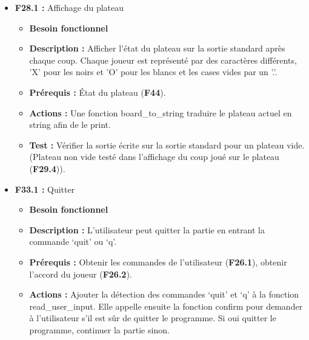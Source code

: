 \documentclass{article}
\begin{document}
\begin{itemize}
\begin{itemize}
\begin{itemize}
            \item \textbf{F29.4 :} Afficher le coup joué sur le plateau
            \begin{itemize}
                \item \textbf{Description :} L’affichage du plateau est mis à jour avec le nouveau coup joué.
                \item \textbf{Prérequis :} Jouer un coup (\textbf{F29.3}), affichage du plateau (\textbf{F28}).
                \item \textbf{Actions :} Rien à faire si F28 est implémentée correctement.
                \item \textbf{Tests :} Lire la sortie standard et vérifier que le coup joué se trouve au bon endroit.
            \end{itemize}
        \end{itemize}
    \end{itemize}
\bigskip
    \item \textbf{F28.1 :} Affichage du plateau
    \begin{itemize}
        \item \textbf{Besoin fonctionnel}
        \item \textbf{Description :} Afficher l’état du plateau sur la sortie standard après chaque coup. Chaque joueur est représenté par des caractères différents, ’X’ pour les noirs et ’O’ pour les blancs et les cases vides par un ’.’.
        \item \textbf{Prérequis :} État du plateau (\textbf{F44}).
        \item \textbf{Actions :} Une fonction board\_to\_string traduire le plateau actuel en string afin de le print.
        \item \textbf{Test :} Vérifier la sortie écrite sur la sortie standard pour un plateau vide. (Plateau non vide testé dans l'affichage du coup joué sur le plateau (\textbf{F29.4})).
    \end{itemize}
\bigskip
    \item \textbf{F33.1 :} Quitter
    \begin{itemize}
        \item \textbf{Besoin fonctionnel}
        \item \textbf{Description :} L’utilisateur peut quitter la partie en entrant la commande ‘quit’ ou ‘q’.
        \item \textbf{Prérequis :} Obtenir les commandes de l’utilisateur (\textbf{F26.1}), obtenir l’accord du joueur (\textbf{F26.2}).
        \item \textbf{Actions :} Ajouter la détection des commandes ‘quit’ et ‘q’ à la fonction read\_user\_input. Elle appelle ensuite la fonction confirm pour demander à l’utilisateur s'il est sûr de quitter le programme. Si oui quitter le programme, continuer la partie sinon.

\end{itemize}
\end{itemize}
\end{document}
